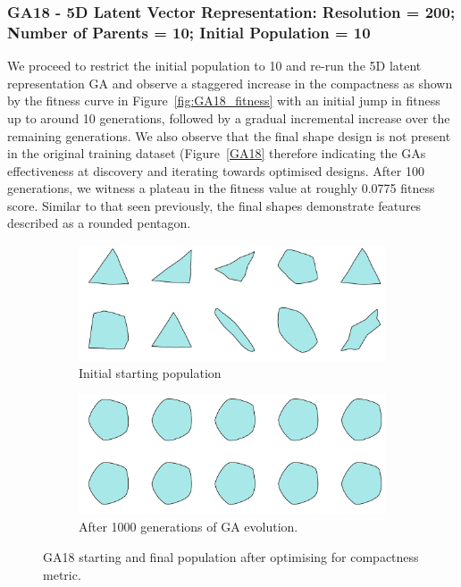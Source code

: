 \documentclass{article}
\begin{document}
\subsubsection*{GA18 - 5D Latent Vector Representation: Resolution = 200; Number of Parents = 10; Initial Population = 10}
We proceed to restrict the initial population to 10 and re-run the 5D latent representation GA and observe a staggered increase in the compactness as shown by the fitness curve in Figure~\ref{fig:GA18_fitness} with an initial jump in fitness up to around 10 generations, followed by a gradual incremental increase over the remaining generations. We also observe that the final shape design is not present in the original training dataset (Figure~\ref{GA18} therefore indicating the GAs effectiveness at discovery and iterating towards optimised designs. After 100 generations, we witness a plateau in the fitness value at roughly 0.0775 fitness score. Similar to that seen previously, the final shapes demonstrate features described as a rounded pentagon.
\begin{figure}[H]
    \centering
    \begin{subfigure}[b]{0.45\textwidth}
        \centering
        \includegraphics[width=\textwidth]{figures/GAResults/GA18/init_pop10.png}
        \caption{Initial starting population}
        \label{fig:GA18_starting}
    \end{subfigure}
    \hfill
    \begin{subfigure}[b]{0.45\textwidth}
        \centering
        \includegraphics[width=\textwidth]{figures/GAResults/GA18/final_pop10.png}
        \caption{After 1000 generations of GA evolution.}
        \label{fig:GA18_final}
    \end{subfigure}
    \caption{GA18 starting and final population after optimising for compactness metric.}
    \label{fig:GA18_before_after_GA}
\end{figure}
\end{document}
